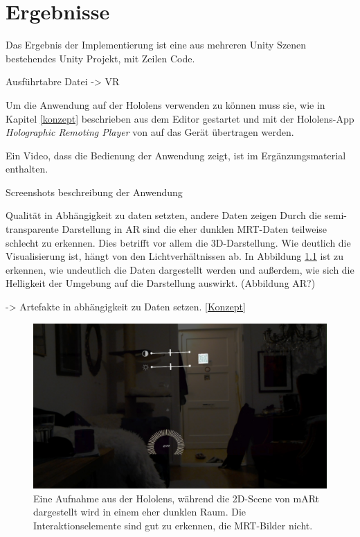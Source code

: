

\chapter{Ergebnisse}
\label{ergebnisse}


Das Ergebnis der Implementierung ist eine aus mehreren Unity Szenen bestehendes Unity Projekt, mit  Zeilen Code. 

Ausführtabre Datei -> VR

Um die Anwendung auf der Hololens verwenden zu können muss sie, wie in Kapitel \ref{konzept} beschrieben aus dem Editor gestartet und mit der Hololens-App \textit{Holographic Remoting Player} von auf das Gerät übertragen werden. 



Ein Video, dass die Bedienung der Anwendung zeigt, ist im Ergänzungsmaterial enthalten.

Screenshots
beschreibung der Anwendung

Qualität in Abhängigkeit zu daten setzten, andere Daten zeigen
Durch die semi-transparente Darstellung in AR sind die eher dunklen MRT-Daten teilweise schlecht zu erkennen. Dies betrifft vor allem die 3D-Darstellung. Wie deutlich die Visualisierung ist, hängt von den Lichtverhältnissen ab. In Abbildung \ref{img:ARLicht} ist zu erkennen, wie undeutlich die Daten dargestellt werden und außerdem, wie sich die Helligkeit der Umgebung auf die Darstellung auswirkt. (Abbildung AR?)

-> Artefakte in abhängigkeit zu Daten setzen. \ref{Konzept}

\begin{figure}[!htb]
	\centering
	\includegraphics[width=0.5\linewidth]{images/hololens2D.jpg}
	\caption{Eine Aufnahme aus der Hololens, während die 2D-Scene von mARt dargestellt wird in einem eher dunklen Raum. Die Interaktionselemente sind gut zu erkennen, die MRT-Bilder nicht.}
	\label{img:ARLicht}
\end{figure}
\FloatBarrier

